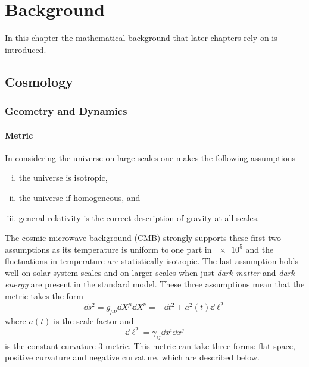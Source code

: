 \chapter{Background}\label{sec:chapter2}

In this chapter the mathematical background that later chapters rely on is introduced.

\section{Cosmology}

\subsection{Geometry and Dynamics}

\subsubsection{Metric}

In considering the universe on large-scales one makes the following assumptions
%
\begin{enumerate}[(i),nosep,left=\parindent]
	\item the universe is isotropic,
	\item the universe if homogeneous, and
	\item general relativity is the correct description of gravity at all scales.
\end{enumerate}
%
The cosmic microwave background (CMB) strongly supports these first two assumptions as its temperature is uniform to one part in \(\num{e5}\) and the fluctuations in temperature are statistically isotropic.
The last assumption holds well on solar system scales and on larger scales when just \emph{dark matter} and \emph{dark energy} are present in the standard model.
These three assumptions mean that the metric takes the form
%
\begin{equation}\label{eq:original_metric}
	\dd{s^{2}}
	= g_{\mu\nu} \dd{X^{\mu}} \dd{X^{\nu}}
	= -\dd{t^{2}} + a^{2}(t) \dd{\ell^{2}}
\end{equation}
%
where \(a(t)\) is the scale factor and
%
\begin{equation}
	\dd{\ell^{2}}
	= \gamma_{i j} \dd{x^{i}} \dd{x^{j}}
\end{equation}
%
is the constant curvature 3-metric.
This metric can take three forms: flat space, positive curvature and negative curvature, which are described below.


